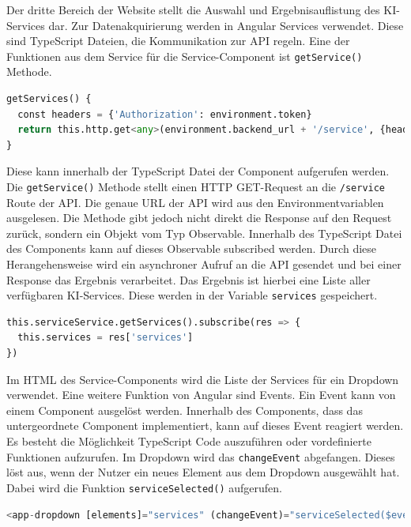 Der dritte Bereich der Website stellt die Auswahl und Ergebnisauflistung des KI-Services dar. Zur Datenakquirierung werden in Angular Services verwendet. Diese sind TypeScript Dateien, die Kommunikation zur API regeln. Eine der Funktionen aus dem Service für die Service-Component ist \texttt{getService()} Methode. 

\begin{lstlisting}[language=Python, caption={Abfrage der Services}]
getServices() {
  const headers = {'Authorization': environment.token}
  return this.http.get<any>(environment.backend_url + '/service', {headers})
}
\end{lstlisting}

Diese kann innerhalb der TypeScript Datei der Component aufgerufen werden. Die \texttt{getService()} Methode stellt einen HTTP GET-Request an die \texttt{/service} Route der API. Die genaue URL der API wird aus den Environmentvariablen ausgelesen. Die Methode gibt jedoch nicht direkt die Response auf den Request zurück, sondern ein Objekt vom Typ Observable. Innerhalb des TypeScript Datei des Components kann auf dieses Observable subscribed werden. Durch diese Herangehensweise wird ein asynchroner Aufruf an die API gesendet und bei einer Response das Ergebnis verarbeitet. Das Ergebnis ist hierbei eine Liste aller verfügbaren KI-Services. Diese werden in der Variable \texttt{services} gespeichert.

\begin{lstlisting}[language=Python, caption={Subscriben auf einen Observable}]
this.serviceService.getServices().subscribe(res => {
  this.services = res['services']
})
\end{lstlisting}

Im HTML des Service-Components wird die Liste der Services für ein Dropdown verwendet. Eine weitere Funktion von Angular sind Events. Ein Event kann von einem Component ausgelöst werden. Innerhalb des Components, dass das untergeordnete Component implementiert, kann auf dieses Event reagiert werden. Es besteht die Möglichkeit TypeScript Code auszuführen oder vordefinierte Funktionen aufzurufen. Im Dropdown wird das \texttt{changeEvent} abgefangen. Dieses löst aus, wenn der Nutzer ein neues Element aus dem Dropdown ausgewählt hat. Dabei wird die Funktion \texttt{serviceSelected()} aufgerufen.

\begin{lstlisting}[language=Python, caption={Dropdown zur Auswahl der Services}]
<app-dropdown [elements]="services" (changeEvent)="serviceSelected($event)"></app-dropdown>
\end{lstlisting}

